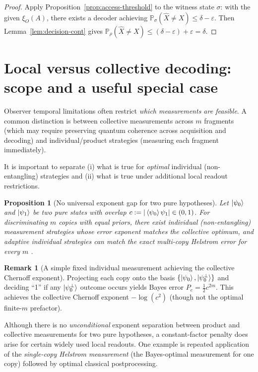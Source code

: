 \documentclass[11pt]{article}
\newcommand{\Prob}{\mathbb{P}}
\newcommand{\1}{\mathbf{1}}
\newcommand{\QCBdist}{\xi}
\theoremstyle{definition}
\newtheorem{remark}{Remark}
\theoremstyle{plain}
\newtheorem{proposition}{Proposition}
\begin{document}
\begin{proof}
Apply Proposition~\ref{prop:access-threshold} to the witness state $\sigma$: with the given $\QCBdist_O(A)$, there exists a decoder achieving
$\Prob_{\sigma}(\widehat{X}\neq X)\le \delta-\varepsilon$.
Then Lemma~\ref{lem:decision-cont} gives
$\Prob_{\rho}(\widehat{X}\neq X)\le (\delta-\varepsilon)+\varepsilon=\delta$.
\end{proof}

\section{Local versus collective decoding: scope and a useful special case}
\label{sec:local-vs-global}

Observer temporal limitations often restrict \emph{which measurements are feasible}.
A common distinction is between collective measurements across $m$ fragments (which may require preserving quantum coherence across acquisition and decoding) and individual/product strategies (measuring each fragment immediately).

It is important to separate (i) what is true for \emph{optimal} individual (non-entangling) strategies and (ii) what is true under additional local readout restrictions.

\begin{proposition}[No universal exponent gap for two pure hypotheses]
\label{prop:no-gap-pure}
Let $\ket{\psi_0}$ and $\ket{\psi_1}$ be two pure states with overlap $c:=|\braket{\psi_0}{\psi_1}|\in(0,1)$.
For discriminating $m$ copies with equal priors, there exist individual (non-entangling) measurement strategies whose error exponent matches the collective optimum, and adaptive individual strategies can match the exact multi-copy Helstrom error for every $m$ \cite{AcinBaganBaigMasanesMunozTapia2005}.
\end{proposition}

\begin{remark}[A simple fixed individual measurement achieving the collective Chernoff exponent]
Projecting each copy onto the basis $\{\ket{\psi_0},\ket{\psi_0^\perp}\}$ and deciding ``1'' if any $\ket{\psi_0^\perp}$ outcome occurs yields Bayes error $P_e=\tfrac12 c^{2m}$.
This achieves the collective Chernoff exponent $-\log(c^{2})$ (though not the optimal finite-$m$ prefactor).
\end{remark}

Although there is no \emph{unconditional} exponent separation between product and collective measurements for two pure hypotheses, a constant-factor penalty does arise for certain widely used local readouts.
One example is repeated application of the \emph{single-copy Helstrom measurement} (the Bayes-optimal measurement for one copy) followed by optimal classical postprocessing.
\end{document}
